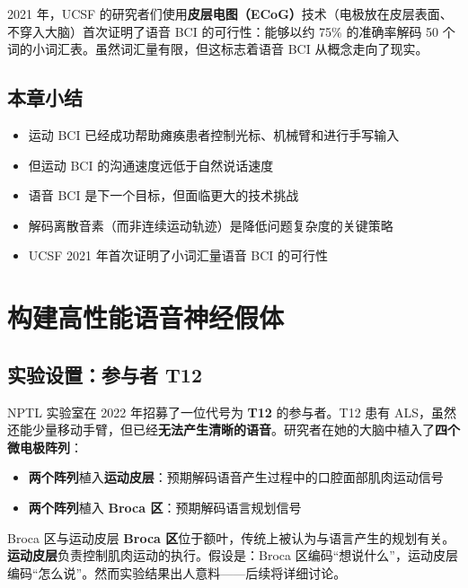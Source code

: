 \documentclass[a4paper]{article}
\begin{document}
2021 年，UCSF 的研究者们使用\textbf{皮层电图（ECoG）}技术（电极放在皮层表面、不穿入大脑）首次证明了语音 BCI 的可行性：能够以约 75\% 的准确率解码 50 个词的小词汇表。虽然词汇量有限，但这标志着语音 BCI 从概念走向了现实。

\subsection{本章小结}

\begin{itemize}
    \item 运动 BCI 已经成功帮助瘫痪患者控制光标、机械臂和进行手写输入
    \item 但运动 BCI 的沟通速度远低于自然说话速度
    \item 语音 BCI 是下一个目标，但面临更大的技术挑战
    \item 解码离散音素（而非连续运动轨迹）是降低问题复杂度的关键策略
    \item UCSF 2021 年首次证明了小词汇量语音 BCI 的可行性
\end{itemize}


\section{构建高性能语音神经假体}

\subsection{实验设置：参与者 T12}

NPTL 实验室在 2022 年招募了一位代号为 \textbf{T12} 的参与者。T12 患有 ALS，虽然还能少量移动手臂，但已经\textbf{无法产生清晰的语音}。研究者在她的大脑中植入了\textbf{四个微电极阵列}：

\begin{itemize}
    \item \textbf{两个阵列}植入\textbf{运动皮层}：预期解码语音产生过程中的口腔面部肌肉运动信号
    \item \textbf{两个阵列}植入 \textbf{Broca 区}：预期解码语言规划信号
\end{itemize}

\begin{knowledgebox}{Broca 区与运动皮层}
\textbf{Broca 区}位于额叶，传统上被认为与语言产生的规划有关。\textbf{运动皮层}负责控制肌肉运动的执行。假设是：Broca 区编码``想说什么''，运动皮层编码``怎么说''。然而实验结果出人意料——后续将详细讨论。
\end{knowledgebox}
\end{document}
